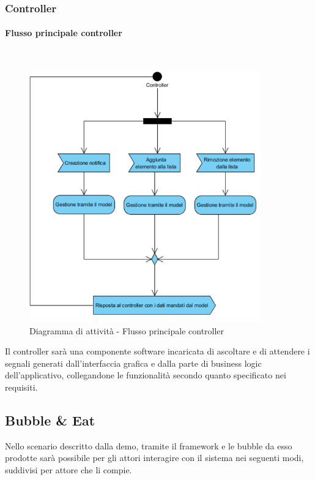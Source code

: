 \subsubsection{Controller}

\paragraph{Flusso principale controller}\mbox{}\\
\nopagebreak
\begin{figure}[H]
	\centering
	\includegraphics[width=10cm]{../../documenti/SpecificaTecnica/diagrammi_img/attivita/controllermainflow.png}
	\caption{Diagramma di attività - Flusso principale controller}
\end{figure}


Il controller sarà una componente software incaricata di ascoltare e di attendere i segnali generati dall'interfaccia grafica e dalla parte di business logic dell'applicativo, collegandone le funzionalità secondo quanto specificato nei requisiti. 

\subsection{Bubble \& Eat}
Nello scenario descritto dalla demo, tramite il framework e le bubble da esso prodotte sarà possibile per gli attori interagire con il sistema nei seguenti modi, suddivisi per attore che li compie.

\subsubsection{\Customer{}}

